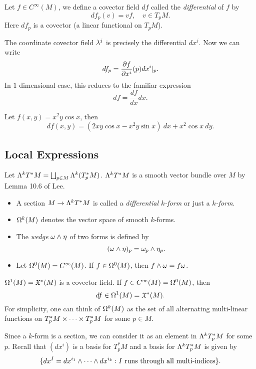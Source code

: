 \begin{definition}
Let $f \in C^\infty(M)$, we define a covector field $df$ called the \textit{differential} of $f$ by 
$$df_p(v) = vf, \quad v \in T_pM. $$
Here $df_p$ is a covector (a linear functional on $T_pM$). 
\end{definition}

The coordinate covector field $\lambda^j$ is precisely the differential $dx^j$. Now we can write 
$$df_p = {\pdv{f}{x^i}}(p)dx^i|_p. $$
In $1$-dimensional case, this reduces to the familiar expression
$$df = \frac{df}{dx}dx. $$
\begin{example}
    Let $f(x,y) = x^2 y \cos x$, then 
    $$df(x,y) = (2xy \cos x - x^2y \sin x)~dx + x^2 \cos x ~dy. $$
\end{example}
\subsection{Local Expressions}
Let $\Lambda^kT^*M = \bigsqcup_{p \in M}\Lambda^k(T_p^*M)$. $\Lambda^kT^*M$ is a smooth vector bundle over $M$ by Lemma 10.6 of Lee. 

\begin{itemize}
    \item A section $M \to \Lambda^k T^*M$ is called a \textit{differential $k$-form} or just a \textit{$k$-form}. 
    \item $\Omega^k(M)$ denotes the vector space of smooth $k$-forms.
    \item The \textit{wedge} $\omega \wedge \eta$ of two forms is defined by 
    $$(\omega \wedge \eta)_p = \omega_p \wedge \eta_p.$$
    \item Let $\Omega^0(M) = C^\infty(M)$. If $ f \in \Omega^0(M)$, then $f \wedge \omega = f\omega$. 
\end{itemize}
\begin{remark}
    $\Omega^1(M) = \frak{X}^*(M)$ is a covector field. If $f \in C^\infty(M) = \Omega^0(M)$, then 
    $$df \in \Omega^1(M) = \frak{X}^*(M). $$
    For simplicity, one can think of $\Omega^k(M)$ as the set of all alternating multi-linear functions on $T_p^*M \times \cdots \times T_p^*M$ for some $p \in M$. 
\end{remark}
Since a $k$-form is a section, we can consider it as an element in $\Lambda^k T_p^*M$ for some $p$. Recall that $(dx^i)$ is a basis for $T_p^*M$ and a basis for $\Lambda^k T_p^*M$ is given by 
$$\{dx^I = dx^{i_1} \wedge \cdots \wedge dx^{i_k}: I \text{ runs through all multi-indices}\}.$$

